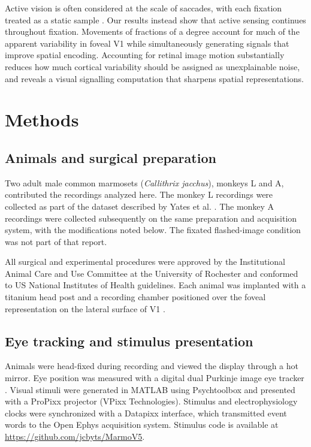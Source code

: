 \documentclass{lite}
\begin{document}
Active vision is often considered at the scale of saccades, with each fixation treated as a static sample \cite{ballard1991animate,najemnik2005optimal,butko2010infomax,yang2016theoretical}. Our results instead show that active sensing continues throughout fixation. Movements of fractions of a degree account for much of the apparent variability in foveal V1 while simultaneously generating signals that improve spatial encoding. Accounting for retinal image motion substantially reduces how much cortical variability should be assigned as unexplainable noise, and reveals a visual signalling computation that sharpens spatial representations.

\section{Methods}

\subsection{Animals and surgical preparation}

Two adult male common marmosets (\textit{Callithrix jacchus}), monkeys L and A, contributed the recordings analyzed here. The monkey L recordings were collected as part of the dataset described by Yates et al. \cite{yates2023detailed}. The monkey A recordings were collected subsequently on the same preparation and acquisition system, with the modifications noted below. The fixated flashed-image condition was not part of that report.

All surgical and experimental procedures were approved by the Institutional Animal Care and Use Committee at the University of Rochester and conformed to US National Institutes of Health guidelines. Each animal was implanted with a titanium head post and a recording chamber positioned over the foveal representation on the lateral surface of V1 \cite{yates2023detailed}.

\subsection{Eye tracking and stimulus presentation}

Animals were head-fixed during recording and viewed the display through a hot mirror. Eye position was measured with a digital dual Purkinje image eye tracker \cite{yates2023detailed, wu2023high, ressmeyer2025openirisdpi}. Visual stimuli were generated in MATLAB using Psychtoolbox \cite{kleiner2007s} and presented with a ProPixx projector (VPixx Technologies). Stimulus and electrophysiology clocks were synchronized with a Datapixx interface, which transmitted event words to the Open Ephys acquisition system. Stimulus code is available at \url{https://github.com/jcbyts/MarmoV5}.
\end{document}

